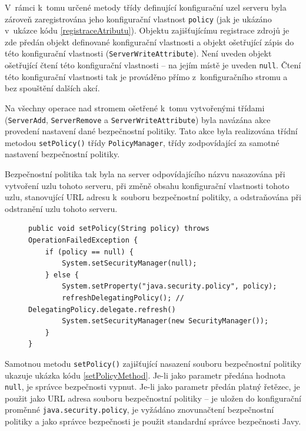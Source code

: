 V~rámci k~tomu určené metody třídy definující konfigurační uzel serveru byla zároveň zaregistrována jeho konfigurační vlastnost {\tt policy} (jak je ukázáno v~ukázce kódu \ref{registraceAtributu}).
Objektu zajišťujícímu registrace zdrojů je zde předán objekt definované konfigurační vlastnosti a objekt ošetřující zápis do této konfigurační vlastnosti ({\tt ServerWriteAttribute}).
Není uveden objekt ošetřující čtení této konfigurační vlastnosti -- na jejím místě je uveden {\tt null}. Čtení této konfigurační vlastnosti tak je prováděno přímo z~konfiguračního stromu a bez spouštění dalších akcí.

Na všechny operace nad stromem ošetřené k~tomu vytvořenými třídami ({\tt ServerAdd}, {\tt ServerRemove} a {\tt ServerWriteAttribute}) byla navázána akce provedení nastavení dané bezpečnostní politiky. Tato akce byla realizována třídní metodou {\tt setPolicy()} třídy {\tt PolicyManager}, třídy zodpovídající za samotné nastavení bezpečnostní politiky.

Bezpečnostní politika tak byla na server odpovídajícího názvu nasazována při vytvoření uzlu tohoto serveru, při změně obsahu konfigurační vlastnosti tohoto uzlu, stanovující URL adresu k~souboru bezpečnostní politiky, a odstraňována při odstranění uzlu tohoto serveru.

\begin{figure}[tbh]
\begin{lstlisting}[caption=Metoda {\tt PolicyManager.setPolicy()} zajišťující nasazení souboru bezpečnostní politiky, label=setPolicyMethod]
public void setPolicy(String policy) throws OperationFailedException {
    if (policy == null) {
        System.setSecurityManager(null);
    } else {
        System.setProperty("java.security.policy", policy);
        refreshDelegatingPolicy(); // DelegatingPolicy.delegate.refresh()
        System.setSecurityManager(new SecurityManager());
    }
}
\end{lstlisting}
\end{figure}

Samotnou metodu {\tt setPolicy()} zajišťující nasazení souboru bezpečnostní politiky ukazuje ukázka kódu \ref{setPolicyMethod}.
Je-li jako parametr předána hodnota  {\tt null}, je správce bezpečnosti vypnut.
Je-li jako parametr předán platný řetězec, je použit jako URL adresa souboru bezpečnostní politiky -- je uložen do konfigurační proměnné {\tt java.security.policy}, je vyžádáno znovunačtení bezpečnostní politiky a jako správce bezpečnosti je použit standardní správce bezpečnosti Javy.

